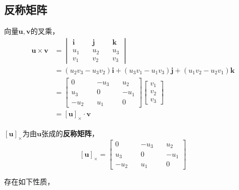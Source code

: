 \documentclass[hpyerref,UTF8,a4paper,titlepage,12pt,oneside]{ctexbook}
\theoremstyle{definition}
\begin{document}
\subsection{反称矩阵}
 	向量$\mathbf{u},\mathbf{v}$的叉乘，
 	\begin{align*}
 		\mathbf{u}\times \mathbf{v} &= 
 		\begin{vmatrix}
 			\mathbf{i}\quad & \mathbf{j}\quad & \mathbf{k}\\
 			u_1\quad& u_2\quad& u_3\\
 			v_1\quad& v_2\quad& v_3
 		\end{vmatrix}\\
 		&= (u_2v_3 -u_3v_2)\mathbf{i} + (u_3v_1 - u_1v_3)\mathbf{j} +(u_1v_2 - u_2v_1)\mathbf{k}\\
 		&=\begin{bmatrix}
 			0 \quad& -u_3\quad & u_2\\
 			u_3\quad & 0\quad& -u_1\\
 			-u_2\quad& u_1\quad& 0
 		\end{bmatrix}
 		\begin{bmatrix}
 			v_1\\
 			v_2\\
 			v_3
 		\end{bmatrix}
 		\\
 		&= [\mathbf{u}]_{\times} \cdot \mathbf{v}
 	\end{align*}

 	$[\mathbf{u}]_{\times}$为由$\mathbf{u}$张成的\textbf{反称矩阵}，
 	$$
 		[\mathbf{u}]_{\times} = 
 		\begin{bmatrix}
 			0 \quad& -u_3\quad & u_2\\
 			u_3\quad & 0\quad& -u_1\\
 			-u_2\quad& u_1\quad& 0
 		\end{bmatrix}
 	$$

	存在如下性质，
\end{document}

